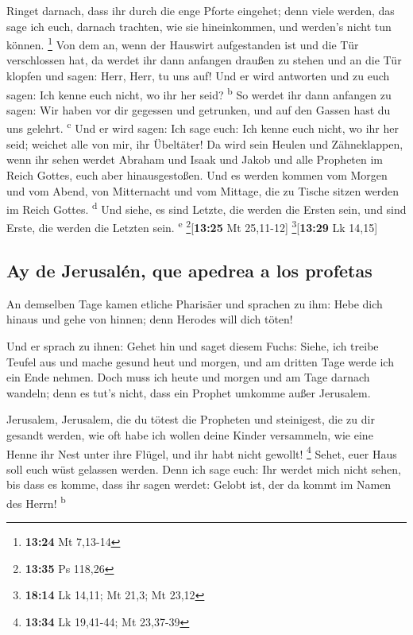  Ringet darnach, dass ihr durch die enge Pforte eingehet;
denn viele werden, das sage ich euch, darnach trachten, wie sie
hineinkommen, und werden's nicht tun können. \footnote{\textbf{13:24} Mt
  7,13-14}  Von dem an, wenn der Hauswirt aufgestanden
ist und die Tür verschlossen hat, da werdet ihr dann anfangen draußen zu
stehen und an die Tür klopfen und sagen: Herr, Herr, tu uns auf! Und er
wird antworten und zu euch sagen: Ich kenne euch nicht, wo ihr her seid?
\textsuperscript{b}  So werdet ihr dann anfangen zu
sagen: Wir haben vor dir gegessen und getrunken, und auf den Gassen hast
du uns gelehrt. \textsuperscript{c}  Und er wird sagen:
Ich sage euch: Ich kenne euch nicht, wo ihr her seid; weichet alle von
mir, ihr Übeltäter!  Da wird sein Heulen und
Zähneklappen, wenn ihr sehen werdet Abraham und Isaak und Jakob und alle
Propheten im Reich Gottes, euch aber hinausgestoßen.  Und
es werden kommen vom Morgen und vom Abend, von Mitternacht und vom
Mittage, die zu Tische sitzen werden im Reich Gottes.
\textsuperscript{d}  Und siehe, es sind Letzte, die
werden die Ersten sein, und sind Erste, die werden die Letzten sein.
\textsuperscript{e} \footnote{\textbf{13:35} Ps 118,26}{[}\textbf{13:25}
Mt 25,11-12{]} \footnote{\textbf{18:14} Lk 14,11; Mt 21,3; Mt 23,12}{[}\textbf{13:29}
Lk 14,15{]}

\hypertarget{ay-de-jerusaluxe9n-que-apedrea-a-los-profetas}{%
\subsection{Ay de Jerusalén, que apedrea a los
profetas}\label{ay-de-jerusaluxe9n-que-apedrea-a-los-profetas}}

 An demselben Tage kamen etliche Pharisäer und sprachen
zu ihm: Hebe dich hinaus und gehe von hinnen; denn Herodes will dich
töten!

 Und er sprach zu ihnen: Gehet hin und saget diesem
Fuchs: Siehe, ich treibe Teufel aus und mache gesund heut und morgen,
und am dritten Tage werde ich ein Ende nehmen.  Doch muss
ich heute und morgen und am Tage darnach wandeln; denn es tut's nicht,
dass ein Prophet umkomme außer Jerusalem.

 Jerusalem, Jerusalem, die du tötest die Propheten und
steinigest, die zu dir gesandt werden, wie oft habe ich wollen deine
Kinder versammeln, wie eine Henne ihr Nest unter ihre Flügel, und ihr
habt nicht gewollt! \footnote{\textbf{13:34} Lk 19,41-44; Mt 23,37-39}
 Sehet, euer Haus soll euch wüst gelassen werden. Denn
ich sage euch: Ihr werdet mich nicht sehen, bis dass es komme, dass ihr
sagen werdet: Gelobt ist, der da kommt im Namen des Herrn!
\textsuperscript{b}

